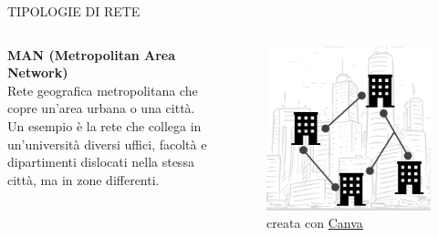 \documentclass[aspectratio=1610]{beamer}
\begin{document}
\begin{frame}{TIPOLOGIE DI RETE}
    \begin{columns}
            \justifying
            \textbf{MAN (Metropolitan Area Network)} \\
            Rete geografica metropolitana che copre un'area urbana o una città. Un esempio è la rete che collega 
            in un'università diversi uffici, facoltà e dipartimenti dislocati nella stessa città, ma in zone 
            differenti.
            \begin{figure}
                \includegraphics[width=\linewidth]{img/man.png}
                \caption{{creata con \href{https://www.canva.com/}{Canva}}}
            \end{figure}
    \end{columns}
\end{frame}
\end{document}
